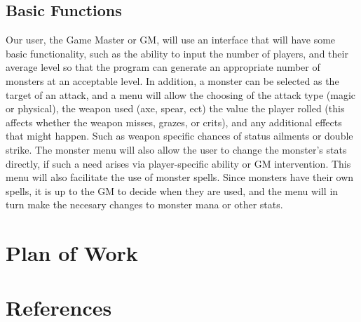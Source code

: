\documentclass[letterpaper,12pt]{article}
\begin{document}
\subsection{Basic Functions}
Our user, the Game Master or GM, will use an interface that will have some 
basic functionality, such as the ability to input the number of players, 
and their average level so that the program can generate an appropriate number 
of monsters at an acceptable level.  In addition, a monster can be selected 
as the target of an attack, and a menu will allow the choosing of the attack type 
(magic or physical), the weapon used (axe, spear, ect) the value the player 
rolled (this affects whether the weapon misses, grazes, or crits), and any 
additional effects that might happen.  Such as weapon specific chances of
status ailments or double strike.  The monster menu will also allow the user to
change the monster's stats directly, if such a need arises via player-specific
ability or GM intervention.  This menu will also facilitate the use of monster
spells.  Since monsters have their own spells, it is up to the GM to decide when
they are used, and the menu will in turn make the necesary changes to monster
mana or other stats.
\section{Plan of Work}
\section{References}
\end{document}
